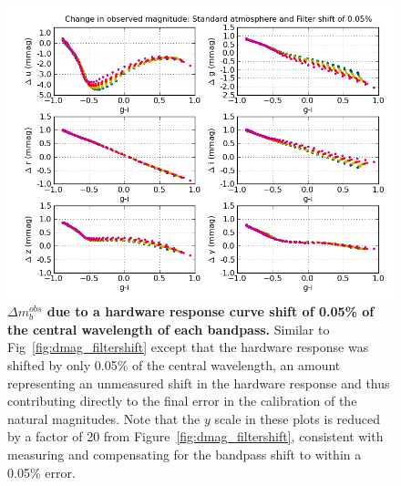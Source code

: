 \documentclass[12pt,preprint]{aastex}
\begin{document}
\begin{figure}
\centering
\includegraphics[width=6in]{delta_mags_filtershift_small}
\caption{{\small 
{\bf $\Delta m_b^{obs}$ due to a hardware
response curve shift of 0.05\% of the central wavelength of each
bandpass.} Similar to Fig~\ref{fig:dmag_filtershift} except that the
hardware response was shifted by only 0.05\% of the central
wavelength, an amount representing an unmeasured shift in the hardware
response and thus contributing directly to the final error in the
calibration of the natural magnitudes. Note that the $y$ scale in
these plots is reduced by a factor of 20 from
Figure~\ref{fig:dmag_filtershift}, consistent with measuring and
compensating for the
bandpass shift to within a 0.05\% error. }}
\label{fig:dmag_filtershift_small} 
\end{figure}
 
\end{document}
